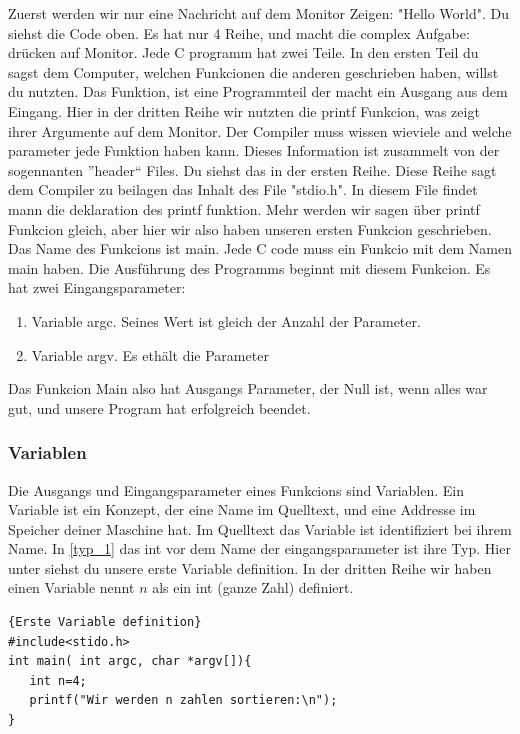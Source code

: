 \documentclass{article}[12pt]
\begin{document}
Zuerst werden wir nur eine Nachricht auf dem Monitor Zeigen: "Hello World". Du siehst die Code oben. Es hat nur 4 Reihe, und
macht die complex Aufgabe: drücken auf Monitor. Jede C programm hat zwei Teile. In den ersten Teil du sagst dem Computer, welchen 
Funkcionen die anderen geschrieben haben, willst du nutzten.  Das Funktion, ist eine Programmteil der macht ein Ausgang aus dem Eingang. 
Hier in der dritten Reihe wir nutzten die printf Funkcion, was zeigt ihrer Argumente auf dem Monitor. Der Compiler muss wissen
wieviele and welche parameter jede Funktion haben kann. Dieses Information ist zusammelt von der sogennanten ''header`` Files. 
Du siehst das in der ersten Reihe. Diese Reihe sagt dem Compiler zu beilagen das Inhalt des File "stdio.h". In diesem File
findet mann die deklaration des printf funktion. Mehr werden wir sagen über printf Funkcion gleich, aber hier wir also
haben unseren ersten Funkcion geschrieben. Das Name des Funkcions ist main. Jede C code muss ein Funkcio mit dem Namen main 
haben. Die Ausführung des Programms beginnt mit diesem Funkcion. Es hat zwei Eingangsparameter:
\begin{enumerate}
\item Variable argc. Seines Wert ist gleich der Anzahl der Parameter.
\item Variable argv. Es ethält die Parameter
\end{enumerate}
Das Funkcion Main also hat Ausgangs Parameter, der Null ist, wenn alles war gut, und unsere Program hat erfolgreich 
beendet.

\subsubsection{Variablen}
Die Ausgangs und Eingangsparameter eines Funkcions sind Variablen.
Ein Variable ist ein Konzept, der eine Name im Quelltext, und eine Addresse im Speicher deiner Maschine hat. 
Im Quelltext das Variable ist identifiziert bei ihrem Name. In \ref{typ_1} das int vor dem Name der eingangsparameter
ist ihre Typ. Hier unter siehst du unsere erste Variable definition. In der dritten Reihe wir haben einen Variable
nennt $n$ als ein int (ganze Zahl) definiert. 
\begin{lstlisting}{Erste Variable definition}
#include<stido.h>
int main( int argc, char *argv[]){
   int n=4;
   printf("Wir werden n zahlen sortieren:\n");
}
\end{lstlisting}
\end{document}
